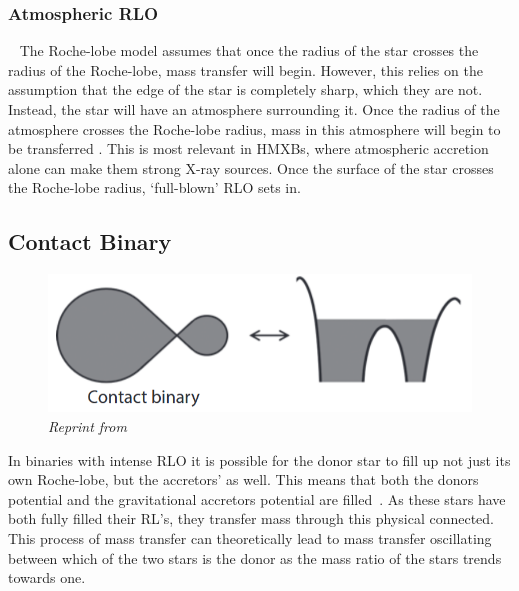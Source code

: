 \documentclass[12pt, a4paper]{article}
\begin{document}
        \subsubsection{Atmospheric RLO}~\label{atmosphericRLO}
        The Roche-lobe model assumes that once the radius of the star crosses the radius of the Roche-lobe, mass transfer will begin. However, this relies on the assumption that the edge of the star is completely sharp, which they are not. Instead, the star will have an atmosphere surrounding it. Once the radius of the atmosphere crosses the Roche-lobe radius, mass in this atmosphere will begin to be transferred \parencite{TaurisvandenHeuvel+2023}. This is most relevant in HMXBs, where atmospheric accretion alone can make them strong X-ray sources. Once the surface of the star crosses the Roche-lobe radius, `full-blown' RLO sets in.

        \subsection{Contact Binary}

        \begin{figure}[H]
            \centering
            \includegraphics[scale = .4]{Figs/reused-figs/Tauris_ContactBinary.png}

            \caption{\textit{Reprint from~\parencite{TaurisvandenHeuvel+2023}}}
            \label{ContactBinaryRL}
        \end{figure}

        In binaries with intense RLO it is possible for the donor star to fill up not just its own Roche-lobe, but the accretors' as well. This means that both the donors potential and the gravitational accretors potential are filled~\parencite{TaurisvandenHeuvel+2023}. As these stars have both fully filled their RL's, they transfer mass through this physical connected. This process of mass transfer can theoretically lead to mass transfer oscillating between which of the two stars is the donor as the mass ratio of the stars trends towards one.
        
\end{document}
